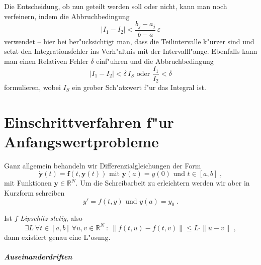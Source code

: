 \documentclass[a4paper]{book}
\renewcommand{\vec}[1]{\ensuremath{\boldsymbol{#1}}}
\begin{document}
Die Entscheidung, ob nun geteilt werden soll oder nicht, kann man noch
verfeinern, indem die Abbruchbedingung
\begin{equation*}
  | I_1 - I_2 | < \frac{b_j - a_j}{b-a} \, \varepsilon
\end{equation*}
verwendet -- hier bei ber"ucksichtigt man, dass die Teilintervalle
k"urzer sind und setzt den Integrationsfehler ins Verh"altnis mit der
Intervalll"ange. Ebenfalls kann man einen Relativen Fehler $\delta$
einf"uhren und die Abbruchbedingung
\begin{equation*}
  | I_1 - I_2 | < \delta \, I_S \text{ oder } \frac{I_1}{I_2} < \delta
\end{equation*}
formulieren, wobei $I_S$ ein grober Sch"atzwert f"ur das Integral ist.














\chapter{Einschrittverfahren f"ur Anfangswertprobleme}
\label{cha:einschr_fur_anfangsw}


Ganz allgemein behandeln wir Differenzialgleichungen der Form
\begin{equation}
  \label{eq:16}
  \dot{ \vec y }(t) = \vec f( t, \vec y(t) ) \text{ mit } \vec y(a) =
  y(0) \text{ und } t \in [a,b] \;,
\end{equation}
mit Funktionen $\vec y \in \mathbb R^N$. Um die Schreibarbeit zu
erleichtern werden wir aber in Kurzform schreiben
\begin{equation}
  \label{eq:18}
  y' = f( t, y) \text{ und } y(a) = y_0 \;.
\end{equation}




\begin{Wichtig}
Ist $f$ \emph{Lipschitz-stetig}, also
\begin{equation}
  \label{eq:19}
\exists L ~ \forall t\in [a,b] ~ \forall u,v \in \mathbb R^N ~: ~  \|
f(t, u ) - f(t, v ) \| \leq L \cdot \| u - v \| \;,
\end{equation}
dann existiert genau eine L"osung.
\end{Wichtig}


\paragraph{Auseinanderdriften}
\label{sec:auseinanderdriften}
\end{document}
